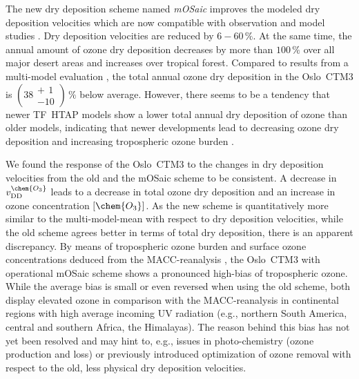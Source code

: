 \documentclass[gmd, manuscript]{copernicus}
\begin{document}
The new dry deposition scheme named \emph{mOSaic} improves the modeled dry deposition velocities which are now compatible with observation and model studies \citep[e.g.,][]{ACP:Hardacre2015,ACP:Luhar2018}. Dry deposition velocities are reduced by $6-60\,\unit{\%}$. At the same time, the annual amount of ozone dry deposition decreases by more than $100\,\unit{\%}$ over all major desert areas and increases over tropical forest. Compared to results from a multi-model evaluation \citep{ACP:Hardacre2015}, the total annual ozone dry deposition in the Oslo~CTM3 is $(38\substack{+~\,1 \\ -10})\,\unit{\%}$ below average. However, there seems to be a tendency that newer TF~HTAP models show a lower total annual dry deposition of ozone than older models, indicating that newer developments lead to decreasing ozone dry deposition and increasing tropospheric ozone burden \citep[e.g.,][]{ACP:Luhar2017,ACP:Luhar2018,AE:Hu2017}.

We found the response of the Oslo~CTM3 to the changes in dry deposition velocities from the old and the mOSaic scheme to be consistent. A decrease in $v_\text{DD}^\chem{O_3}$ leads to a decrease in total ozone dry deposition and an increase in ozone concentration $[\chem{O_3}]$. As the new scheme is quantitatively more similar to the multi-model-mean \citep{ACP:Hardacre2015} with respect to dry deposition velocities, while the old scheme agrees better in terms of total dry deposition, there is an apparent discrepancy. By means of tropospheric ozone burden \citep{ESA:Gaudel2018} and surface ozone concentrations deduced from the MACC-reanalysis \citep{MACC-II}, the Oslo~CTM3 with operational mOSaic scheme shows a pronounced high-bias of tropospheric ozone. While the average bias is small or even reversed when using the old scheme, both display elevated ozone in comparison with the MACC-reanalysis in continental regions with high average incoming UV radiation (e.g., northern South America, central and southern Africa, the Himalayas).
The reason behind this bias has not yet been resolved and may hint to, e.g., issues in photo-chemistry (ozone production and loss) or previously introduced optimization of ozone removal with respect to the old, less physical dry deposition velocities.
\end{document}
